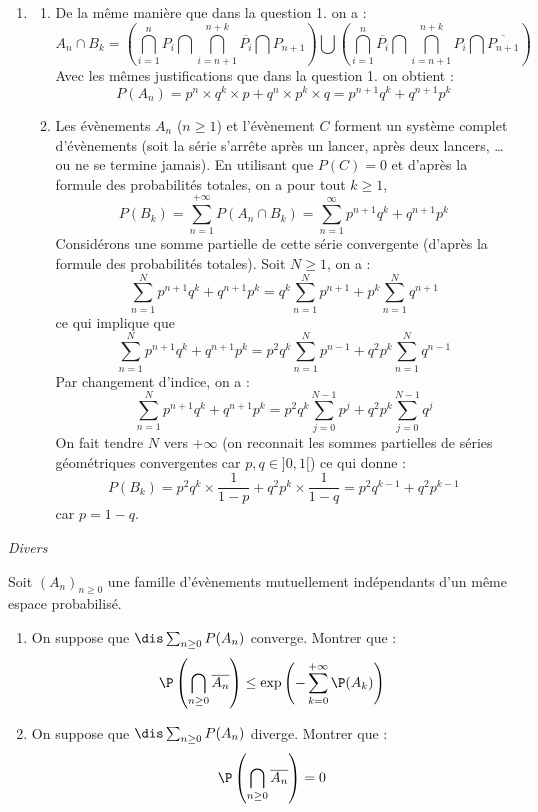 \documentclass[a4paper,10pt]{report}
\begin{document}
\begin{enumerate}
\item 
\begin{enumerate}
\item De la même manière que dans la question 1. on a :
\[ A_n \cap B_k = \left( \bigcap_{i=1}^n P_i \bigcap \bigcap_{i=n+1}^{n+k} \overline{P_i} \bigcap P_{n+1} \right) \bigcup \left( \bigcap_{i=1}^n \overline{P_i} \bigcap \bigcap_{i=n+1}^{n+k} P_i \bigcap \overline{P_{n+1}} \right) \]
Avec les mêmes justifications que dans la question 1. on obtient :
\[ P(A_n) = p^n \times q^k \times p + q^n \times p^k \times q = p^{n+1} q^k + q^{n+1} p^k \]
\item Les évènements $A_n$ ($n \geq 1$) et l'évènement $C$ forment un système complet d'évènements (soit la série s'arrête après un lancer, après deux lancers, \ldots ou ne se termine jamais). En utilisant que $P(C)=0$ et d'après la formule des probabilités totales, on a pour tout $k \geq 1$,
\[ P(B_k) = \sum_{n=1}^{+ \infty} P(A_n \cap B_k) = \sum_{n=1}^{\infty} p^{n+1} q^k + q^{n+1} p^k \]
Considérons une somme partielle de cette série convergente (d'après la formule des probabilités totales). Soit $N \geq 1$, on a :
\[ \sum_{n=1}^N p^{n+1} q^k +q^{n+1} p^k = q^k \sum_{n=1}^N p^{n+1} + p^k \sum_{n=1}^N q^{n+1} \]
ce qui implique que 
\[ \sum_{n=1}^N p^{n+1} q^k +q^{n+1} p^k = p^2 q^k \sum_{n=1}^N p^{n-1} + q^2p^k \sum_{n=1}^N q^{n-1} \]
Par changement d'indice, on a :
\[ \sum_{n=1}^N p^{n+1} q^k +q^{n+1} p^k = p^2 q^k \sum_{j=0}^{N-1} p^{j} + q^2p^k \sum_{j=0}^{N-1} q^{j} \]
On fait tendre $N$ vers $+\infty$ (on reconnait les sommes partielles de séries géométriques convergentes car $p,q \in ]0,1[$) ce qui donne :
\[ P(B_k) = p^2 q^k \times \frac{1}{1-p} + q^2 p^k \times \frac{1}{1-q} = p^2 q^{k-1} + q^2 p^{k-1} \]
car $p=1-q$.
\end{enumerate}
\end{enumerate}

\medskip

\begin{center}
\textit{{ {\large Divers}}}
\end{center}

\medskip


\begin{Exercice}{} Soit $(A_n)_{n \geq 0}$ une famille d'évènements mutuellement indépendants d'un même espace probabilisé.
\begin{enumerate}
\item On suppose que $\dis \sum_{n \geq 0} P(A_n)$ converge. Montrer que :
$$ \P \left( \bigcap_{n \geq 0} \overline{A_n} \right) \leq \exp \left(- \sum_{k=0}^{+ \infty} \P(A_k) \right)$$
\item On suppose que $\dis \sum_{n \geq 0} P(A_n)$ diverge. Montrer que :
$$ \P \left( \bigcap_{n \geq 0} \overline{A_n} \right) = 0$$
\end{enumerate}
\end{Exercice}
\end{document}
